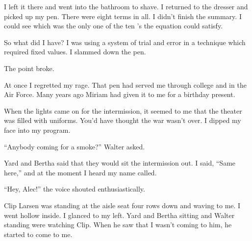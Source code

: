 \documentclass{novel}
\begin{document}
\noindent{}

\noindent{}

\noindent{}

\noindent{}

I left it there and went into the bathroom to shave. I returned to the dresser and picked up my pen. There were eight terms in all. I didn’t finish the summary. I could see which was the only one of the ten ’s the equation could satisfy.

So what did I have? I was using a system of trial and error in a technique which required fixed values. I slammed down the pen.

The point broke.

At once I regretted my rage. That pen had served me through college and in the Air Force. Many years ago Miriam had given it to me for a birthday present.

\vspace{2\nbs}
\clearpage
\thispagestyle{empty}
\begin{ChapterStart}
\vspace{3\nbs}
\end{ChapterStart}

When the lights came on for the intermission, it seemed to me that the theater was filled with uniforms. You’d have thought the war wasn’t over. I dipped my face into my program.

“Anybody coming for a smoke?” Walter asked.

Yard and Bertha said that they would sit the intermission out. I said, “Same here,” and at the moment I heard my name called.

“Hey, Alec!” the voice shouted enthusiastically.

Clip Larsen was standing at the aisle seat four rows down and waving to me. I went hollow inside. I glanced to my left. Yard and Bertha sitting and Walter standing were watching Clip. When he saw that I wasn’t coming to him, he started to come to me.
\end{document}
